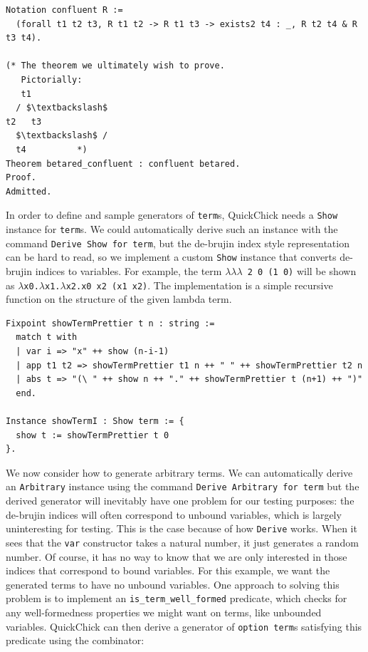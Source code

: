 \documentclass[twoside,11pt,openright]{report}
\newenvironment{code}{\captionsetup{type=figure, singlelinecheck=off, justification=raggedleft}}{}
\newcommand{\coq}[1]{\texttt{#1}}
\begin{document}
\begin{code}
\begin{verbatim}
Notation confluent R :=
  (forall t1 t2 t3, R t1 t2 -> R t1 t3 -> exists2 t4 : _, R t2 t4 & R t3 t4).

(* The theorem we ultimately wish to prove.
   Pictorially:
   t1
  / $\textbackslash$
t2   t3
  $\textbackslash$ /
  t4          *)
Theorem betared_confluent : confluent betared.
Proof.
Admitted.
\end{verbatim}
\end{code}
In order to define and sample generators of \coq{term}s, QuickChick needs a \coq{Show} instance for \coq{term}s. We could automatically derive such an instance with the command \coq{Derive Show for term}, but the de-brujin index style representation can be hard to read, so we implement a custom \coq{Show} instance that converts de-brujin indices to variables. For example, the term \coq{$\lambda \lambda \lambda$ 2 0 (1 0)} will be shown as \coq{$\lambda$x0.$\lambda$x1.$\lambda$x2.x0 x2 (x1 x2)}. The implementation is a simple recursive function on the structure of the given lambda term.
\begin{code}
\begin{verbatim}
Fixpoint showTermPrettier t n : string :=
  match t with 
  | var i => "x" ++ show (n-i-1)
  | app t1 t2 => showTermPrettier t1 n ++ " " ++ showTermPrettier t2 n
  | abs t => "(\ " ++ show n ++ "." ++ showTermPrettier t (n+1) ++ ")"
  end.

Instance showTermI : Show term := {
  show t := showTermPrettier t 0
}.
\end{verbatim}
\end{code}
We now consider how to generate arbitrary terms. We can automatically derive an \coq{Arbitrary} instance using the command \coq{Derive Arbitrary for term} but the derived generator will inevitably have one problem for our testing purposes: the de-brujin indices will often correspond to unbound variables, which is largely uninteresting for testing. This is the case because of how \coq{Derive} works. When it sees that the \coq{var} constructor takes a natural number, it just generates a random number. Of course, it has no way to know that we are only interested in those indices that correspond to bound variables. For this example, we want the generated terms to have no unbound variables. One approach to solving this problem is to implement an \coq{is\_term\_well\_formed} predicate, which checks for any well-formedness properties we might want on terms, like unbounded variables. QuickChick can then derive a generator of \coq{option term}s satisfying this predicate using the combinator:
\end{document}

